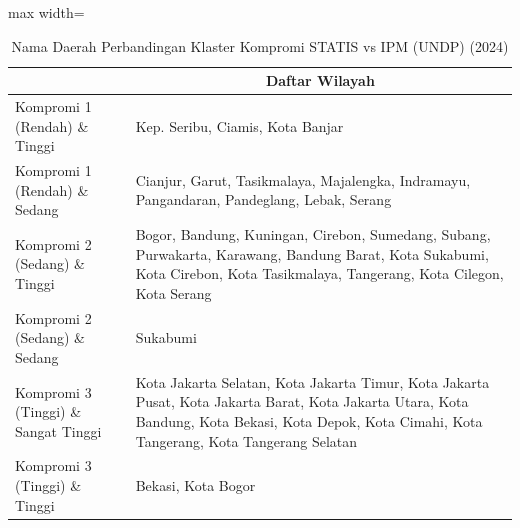 \begin{table}[H]
\centering
\caption{Nama Daerah Perbandingan Klaster Kompromi STATIS vs IPM (UNDP) (2024)} \label{tab:app2comp_ipm_name_2024}
\begin{adjustbox}{max width=\textwidth}
\begin{tabular}{|>{\centering\arraybackslash}p{4cm}|p{10cm}|}
\hline
\multicolumn{1}{|c|}{\textbf{Kategori}} & \multicolumn{1}{c|}{\textbf{Daftar Wilayah}} \\
\hline
Kompromi 1 (Rendah) \& Tinggi & Kep. Seribu, Ciamis, Kota Banjar \\
\hline
Kompromi 1 (Rendah) \& Sedang & Cianjur, Garut, Tasikmalaya, Majalengka, Indramayu, Pangandaran, Pandeglang, Lebak, Serang \\
\hline
Kompromi 2 (Sedang) \& Tinggi & Bogor, Bandung, Kuningan, Cirebon, Sumedang, Subang, Purwakarta, Karawang, Bandung Barat, Kota Sukabumi, Kota Cirebon, Kota Tasikmalaya, Tangerang, Kota Cilegon, Kota Serang \\
\hline
Kompromi 2 (Sedang) \& Sedang & Sukabumi \\
\hline
Kompromi 3 (Tinggi) \& Sangat Tinggi & Kota Jakarta Selatan, Kota Jakarta Timur, Kota Jakarta Pusat, Kota Jakarta Barat, Kota Jakarta Utara, Kota Bandung, Kota Bekasi, Kota Depok, Kota Cimahi, Kota Tangerang, Kota Tangerang Selatan \\
\hline
Kompromi 3 (Tinggi) \& Tinggi & Bekasi, Kota Bogor \\
\hline
\end{tabular}
\end{adjustbox}
\end{table}